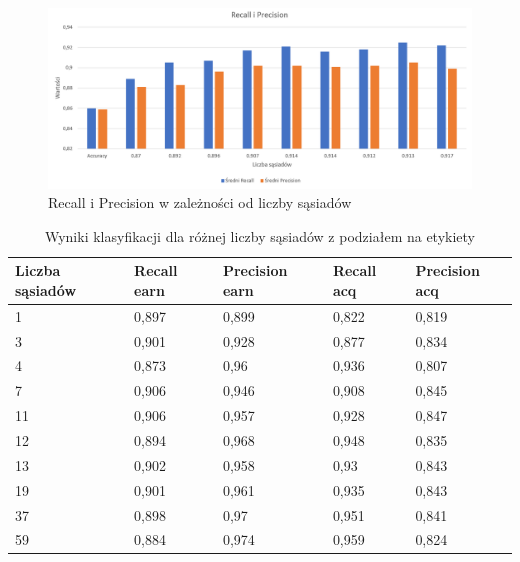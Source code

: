 \documentclass{classrep}
\begin{document}
{\begin{figure}[H]
\caption{Recall i Precision w zależności od liczby sąsiadów}
\centering
\includegraphics[width=1\textwidth]{i8}
\end{figure}

\begin{table}[H]
\begin{center}
\caption{Wyniki klasyfikacji dla różnej liczby sąsiadów z podziałem na etykiety}
\begin{tabular}{|l|l|l|l|l|}
\hline
\textbf{Liczba sąsiadów} & \textbf{Recall earn} & \textbf{Precision earn} & \textbf{Recall acq} & \textbf{Precision acq} \\ \hline
1                        & 0,897                & 0,899                   & 0,822               & 0,819                  \\ \hline
3                        & 0,901                & 0,928                   & 0,877               & 0,834                  \\ \hline
4                        & 0,873                & 0,96                    & 0,936               & 0,807                  \\ \hline
7                        & 0,906                & 0,946                   & 0,908               & 0,845                  \\ \hline
11                       & 0,906                & 0,957                   & 0,928               & 0,847                  \\ \hline
12                       & 0,894                & 0,968                   & 0,948               & 0,835                  \\ \hline
13                       & 0,902                & 0,958                   & 0,93                & 0,843                  \\ \hline
19                       & 0,901                & 0,961                   & 0,935               & 0,843                  \\ \hline
37                       & 0,898                & 0,97                    & 0,951               & 0,841                  \\ \hline
59                       & 0,884                & 0,974                   & 0,959               & 0,824                  \\ \hline
\end{tabular}
\end{center}
\end{table}

}
\end{document}
